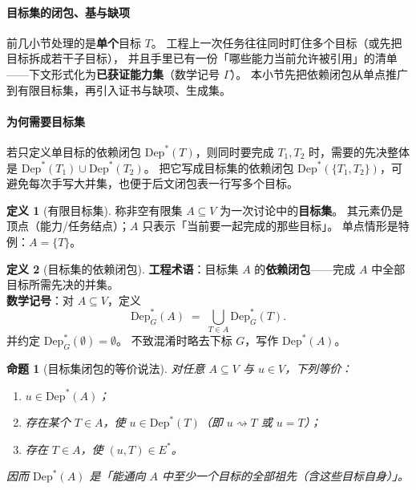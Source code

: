 \documentclass[UTF8,a4paper,11pt]{ctexart}
\theoremstyle{definition}
\newtheorem{definition}{定义}[section]
\theoremstyle{plain}
\newtheorem{proposition}{命题}[section]
\theoremstyle{remark}
\numberwithin{figure}{section}
\numberwithin{table}{section}
\begin{document}
\paragraph{目标集的闭包、基与缺项}

前几小节处理的是\textbf{单个}目标 $T$。
工程上一次任务往往同时盯住多个目标（或先把目标拆成若干子目标），
并且手里已有一份「哪些能力当前允许被引用」的清单——下文形式化为\textbf{已获证能力集}（数学记号 $\Gamma$）。
本小节先把依赖闭包从单点推广到有限目标集，再引入证书与缺项、生成集。

\paragraph{为何需要目标集}
若只定义单目标的依赖闭包 $\mathrm{Dep}^*(T)$，则同时要完成 $T_1,T_2$ 时，需要的先决整体是
$\mathrm{Dep}^*(T_1)\cup\mathrm{Dep}^*(T_2)$。
把它写成目标集的依赖闭包 $\mathrm{Dep}^*(\{T_1,T_2\})$，可避免每次手写大并集，也便于后文闭包表一行写多个目标。

\begin{definition}[有限目标集]
称非空有限集 $A\subseteq V$ 为一次讨论中的\textbf{目标集}。
其元素仍是顶点（能力/任务结点）；$A$ 只表示「当前要一起完成的那些目标」。
单点情形是特例：$A=\{T\}$。
\end{definition}

\begin{definition}[目标集的依赖闭包]
\label{def:dep-star-set}
\textbf{工程术语}：目标集 $A$ 的\textbf{依赖闭包}——完成 $A$ 中全部目标所需先决的并集。\\
\textbf{数学记号}：对 $A\subseteq V$，定义
\[
\mathrm{Dep}^*_G(A)
\;=\;
\bigcup_{T\in A}\mathrm{Dep}^*_G(T).
\]
并约定 $\mathrm{Dep}^*_G(\emptyset)=\emptyset$。
不致混淆时略去下标 $G$，写作 $\mathrm{Dep}^*(A)$。
\end{definition}

\begin{proposition}[目标集闭包的等价说法]
对任意 $A\subseteq V$ 与 $u\in V$，下列等价：
\begin{enumerate}
  \item $u\in\mathrm{Dep}^*(A)$；
  \item 存在某个 $T\in A$，使 $u\in\mathrm{Dep}^*(T)$（即 $u\rightsquigarrow T$ 或 $u=T$）；
  \item 存在 $T\in A$，使 $(u,T)\in E^{*}$。
\end{enumerate}
因而 $\mathrm{Dep}^*(A)$ 是「能通向 $A$ 中至少一个目标的全部祖先（含这些目标自身）」。
\end{proposition}
\end{document}
